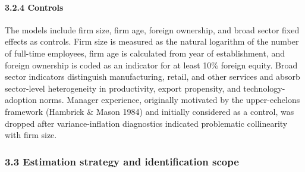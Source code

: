 \documentclass[
  12pt,a4paper]{article}
\begin{document}
\hypertarget{controls}{%
\paragraph{3.2.4 Controls}\label{controls}}

The models include firm size, firm age, foreign ownership, and broad
sector fixed effects as controls. Firm size is measured as the natural
logarithm of the number of full-time employees, firm age is calculated
from year of establishment, and foreign ownership is coded as an
indicator for at least 10\% foreign equity. Broad sector indicators
distinguish manufacturing, retail, and other services and absorb
sector-level heterogeneity in productivity, export propensity, and
technology-adoption norms. Manager experience, originally motivated by
the upper-echelons framework (Hambrick \& Mason 1984) and initially
considered as a control, was dropped after variance-inflation
diagnostics indicated problematic collinearity with firm size.

\hypertarget{estimation-strategy-and-identification-scope}{%
\subsubsection{3.3 Estimation strategy and identification
scope}\label{estimation-strategy-and-identification-scope}}
\end{document}
